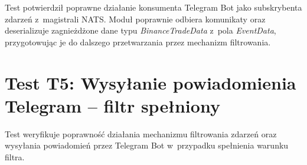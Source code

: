 Test potwierdził poprawne działanie konsumenta Telegram Bot jako subskrybenta zdarzeń z~magistrali NATS\@.
Moduł poprawnie odbiera komunikaty oraz deserializuje zagnieżdżone dane typu \textit{BinanceTradeData} z~pola
\textit{EventData}, przygotowując je do dalszego przetwarzania przez mechanizm filtrowania.

\newpage


\section{Test T5: Wysyłanie powiadomienia Telegram -- filtr spełniony}
\label{sec:test_telegram_filter_pass}

Test weryfikuje poprawność działania mechanizmu filtrowania zdarzeń oraz wysyłania powiadomień przez Telegram Bot
w~przypadku spełnienia warunku filtra.

\vspace{0.5cm}

